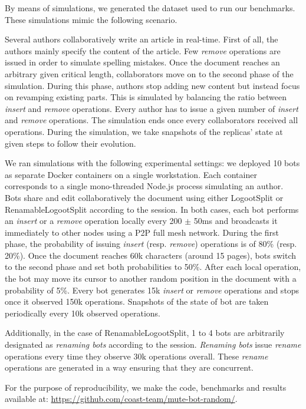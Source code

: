 \documentclass[10pt,journal,compsoc]{IEEEtran}
\begin{document}
By means of simulations, we generated the dataset used to run our benchmarks.
These simulations mimic the following scenario.

Several authors collaboratively write an article in real-time.
First of all, the authors mainly specify the content of the article.
Few \emph{remove} operations are issued in order to simulate spelling mistakes.
Once the document reaches an arbitrary given critical length, collaborators move on to the second phase of the simulation.
During this phase, authors stop adding new content but instead focus on revamping existing parts.
This is simulated by balancing the ratio between \emph{insert} and \emph{remove} operations.
Every author has to issue a given number of \emph{insert} and \emph{remove} operations.
The simulation ends once every collaborators received all operations.
During the simulation, we take snapshots of the replicas' state at given steps to follow their evolution.

We ran simulations with the following experimental settings: we deployed 10 bots as separate Docker containers on a single workstation.
Each container corresponds to a single mono-threaded Node.js process simulating an author.
Bots share and edit collaboratively the document using either LogootSplit or RenamableLogootSplit according to the session.
In both cases, each bot performs an \emph{insert} or a \emph{remove} operation locally every 200 $\pm$ 50ms and broadcasts it immediately to other nodes using a \ac{P2P} full mesh network.
During the first phase, the probability of issuing \emph{insert} (resp. \emph{remove}) operations is of 80\% (resp. 20\%).
Once the document reaches 60k characters (around 15 pages), bots switch to the second phase and set both probabilities to 50\%.
After each local operation, the bot may move its cursor to another random position in the document with a probability of 5\%.
Every bot generates 15k \emph{insert} or \emph{remove} operations and stops once it observed 150k operations.
Snapshots of the state of bot are taken periodically every 10k observed operations.

Additionally, in the case of RenamableLogootSplit, 1 to 4 bots are arbitrarily designated as \emph{renaming bots} according to the session.
\emph{Renaming bots} issue \emph{rename} operations every time they observe 30k operations overall.
These \emph{rename} operations are generated in a way ensuring that they are concurrent.

For the purpose of reproducibility, we make the code, benchmarks and results available at: \url{https://github.com/coast-team/mute-bot-random/}.
\end{document}
